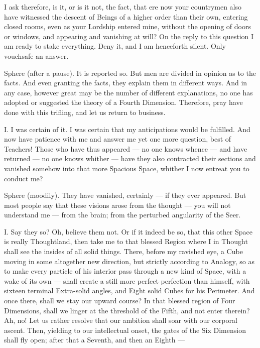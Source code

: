 \documentclass[12pt, a4paper, oneside]{memoir}
\begin{document}
I ask therefore, is it, or is it not, the fact, that ere now your countrymen
also have witnessed the descent of Beings of a higher order than their own,
entering closed rooms, even as your Lordship entered mine, without the opening
of doors or windows, and appearing and vanishing at will? On the reply to this
question I am ready to stake everything. Deny it, and I am henceforth silent.
Only vouchsafe an answer.

Sphere (after a pause). It is reported so. But men are divided in opinion as
to the facts. And even granting the facts, they explain them in different
ways. And in any case, however great may be the number of different
explanations, no one has adopted or suggested the theory of a Fourth
Dimension. Therefore, pray have done with this trifling, and let us return to
business.

I. I was certain of it. I was certain that my anticipations would be
fulfilled. And now have patience with me and answer me yet one more question,
best of Teachers! Those who have thus appeared --- no one knows whence --- and
have returned --- no one knows whither --- have they also contracted their
sections and vanished somehow into that more Spacious Space, whither I now
entreat you to conduct me?

Sphere (moodily). They have vanished, certainly --- if they ever appeared. But
most people say that these visions arose from the thought --- you will not
understand me --- from the brain; from the perturbed angularity of the Seer.

I. Say they so? Oh, believe them not. Or if it indeed be so, that this other
Space is really Thoughtland, then take me to that blessed Region where I in
Thought shall see the insides of all solid things. There, before my ravished
eye, a Cube moving in some altogether new direction, but strictly according to
Analogy, so as to make every particle of his interior pass through a new kind
of Space, with a wake of its own --- shall create a still more perfect
perfection than himself, with sixteen terminal Extra-solid angles, and Eight
solid Cubes for his Perimeter. And once there, shall we stay our upward
course? In that blessed region of Four Dimensions, shall we linger at the
threshold of the Fifth, and not enter therein? Ah, no! Let us rather resolve
that our ambition shall soar with our corporal ascent. Then, yielding to our
intellectual onset, the gates of the Six Dimension shall fly open; after that
a Seventh, and then an Eighth ---
\end{document}
